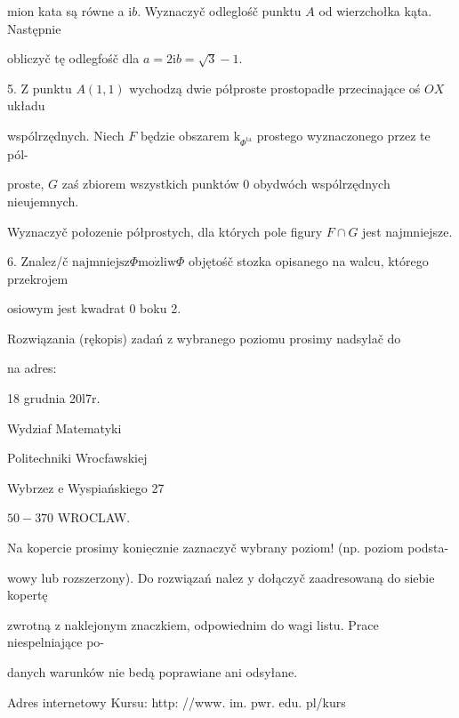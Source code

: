 \documentclass[a4paper,12pt]{article}
\begin{document}
mion kata są równe a $\mathrm{i}b$. Wyznaczyč odleglośč punktu $A$ od wierzchołka kąta. Następnie

obliczyč tę odlegfośč dla $a=2\mathrm{i}b=\sqrt{3}-1.$

5. $\mathrm{Z}$ punktu $A(1,1)$ wychodzą dwie półproste prostopadłe przecinające oś $OX$ układu

wspólrzędnych. Niech $F$ będzie obszarem $\mathrm{k}_{\Phi^{\mathrm{t}\mathrm{a}}}$ prostego wyznaczonego przez te pól-

proste, $G$ zaś zbiorem wszystkich punktów $0$ obydwóch wspólrzędnych nieujemnych.

Wyznaczyč połozenie półprostych, dla których pole figury $F\cap G$ jest najmniejsze.

6. Znalez/č $\mathrm{n}\mathrm{a}\mathrm{j}\mathrm{m}\mathrm{n}\mathrm{i}\mathrm{e}\mathrm{j}\mathrm{s}\mathrm{z}\Phi \mathrm{m}\mathrm{o}\dot{\mathrm{z}}\mathrm{l}\mathrm{i}\mathrm{w}\Phi$ objętośč stozka opisanego na walcu, którego przekrojem

osiowym jest kwadrat $0$ boku 2.

Rozwiązania (rękopis) zadań z wybranego poziomu prosimy nadsylač do

na adres:

18 grudnia 20l7r.

Wydziaf Matematyki

Politechniki Wrocfawskiej

Wybrzez $\mathrm{e}$ Wyspiańskiego 27

$50-370$ WROCLAW.

Na kopercie prosimy $\underline{\mathrm{k}\mathrm{o}\mathrm{n}\mathrm{i}\mathrm{e}\mathrm{c}\mathrm{z}\mathrm{n}\mathrm{i}\mathrm{e}}$ zaznaczyč wybrany poziom! (np. poziom podsta-

wowy lub rozszerzony). Do rozwiązań nalez $\mathrm{y}$ dołączyč zaadresowaną do siebie kopertę

zwrotną $\mathrm{z}$ naklejonym znaczkiem, odpowiednim do wagi listu. Prace niespelniające po-

danych warunków nie bedą poprawiane ani odsyłane.

Adres internetowy Kursu: http: //www. im. pwr. edu. pl/kurs
\end{document}
